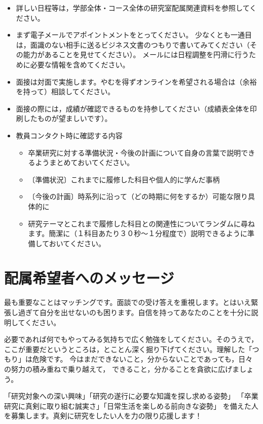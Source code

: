 \documentclass[paper=a4paper,fontsize=10.4pt]{jlreq}
\begin{document}
\begin{itemize}[topsep=0pt]
  \item 詳しい日程等は，学部全体・コース全体の研究室配属関連資料を参照してください。
  \item まず電子メールでアポイントメントをとってください。
    少なくとも一通目は，面識のない相手に送るビジネス文書のつもりで書いてみてください（その能力があることを見せてください）。
    メールには日程調整を円滑に行うために必要な情報を含めてください。
  \item 面接は対面で実施します。やむを得ずオンラインを希望される場合は（余裕を持って）相談してください。
  \item 面接の際には，成績が確認できるものを持参してください（成績表全体を印刷したものが望ましいです）。
  \item 教員コンタクト時に確認する内容
    \begin{itemize}
      \item 卒業研究に対する準備状況・今後の計画について自身の言葉で説明できるようまとめておいてください。
      \item 〔準備状況〕これまでに履修した科目や個人的に学んだ事柄
      \item 〔今後の計画〕時系列に沿って（どの時期に何をするか）可能な限り具体的に
      \item 研究テーマとこれまで履修した科目との関連性についてランダムに尋ねます。簡潔に（１科目あたり３０秒～１分程度で）説明できるように準備しておいてください。
    \end{itemize}
\end{itemize}

\section{配属希望者へのメッセージ}

最も重要なことはマッチングです。面談での受け答えを重視します。とはいえ緊張し過ぎて自分を出せないのも困ります。自信を持ってあなたのことを十分に説明してください。

必要であれば何でもやってみる気持ちで広く勉強をしてください。そのうえで，ここが重要だというところは，とことん深く掘り下げてください。理解した「つもり」は危険です。
今はまだできないこと，分からないことであっても，日々の努力の積み重ねで乗り越えて，
できること，分かることを貪欲に広げましょう。

「研究対象への深い興味」「研究の遂行に必要な知識を探し求める姿勢」
「卒業研究に真剣に取り組む誠実さ」「日常生活を楽しめる前向きな姿勢」
を備えた人を募集します。真剣に研究をしたい人を力の限り応援します！

%
%
\end{document}
